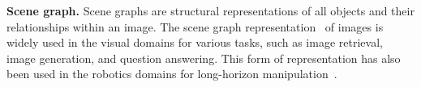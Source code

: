 
\noindent\textbf{Scene graph.} Scene graphs are  structural representations of all objects and their relationships within an image. The scene graph representation~\cite{Chang_2023} of images is widely used in the visual domains for various tasks, such as image retrieval\cite{DBLP:journals/corr/JohnsonHMHLZG17}, image generation\citep{johnson2018image}, and question answering\citep{teney2017graphstructured}.
This form of representation has also been used in the robotics domains 
for long-horizon manipulation~\citep{zhu2021hierarchical}.
